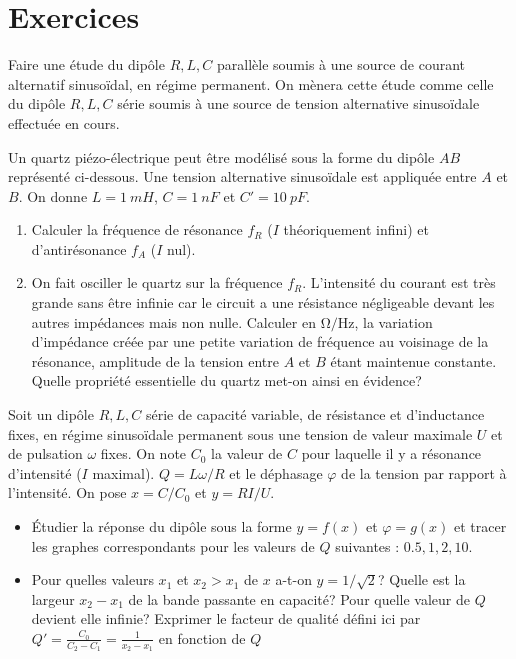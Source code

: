 \section{Exercices}%
\begin{exercice}%
  Faire une étude du dipôle \(R, L, C\) parallèle soumis à une source de 
  courant alternatif sinusoïdal, en régime permanent. On mènera cette étude 
  comme celle du dipôle \(R, L, C\) série soumis à une source de tension 
  alternative sinusoïdale effectuée en cours.
\end{exercice}%
\begin{exercice}%
  Un quartz piézo-électrique peut être modélisé sous la forme du dipôle \(AB\) 
  représenté ci-dessous. Une tension alternative sinusoïdale est appliquée 
  entre \(A\) et \(B\). On donne \(L=\SI{1}{mH}\), \(C=\SI{1}{nF}\) et 
  \(C'=\SI{10}{pF}\).
  \begin{enumerate}
    \item Calculer la fréquence de résonance \(f_R\) (\(I\) théoriquement 
    infini) et d'antirésonance \(f_A\) (\(I\) nul). \item On fait osciller le 
      quartz sur la fréquence \(f_R\). L'intensité du courant est très grande 
      sans être infinie car le circuit a une résistance négligeable devant les 
      autres impédances mais non nulle. Calculer en \(\si{\ohm\per\hertz}\), la 
      variation d'impédance créée par une petite variation de fréquence au 
      voisinage de la résonance, amplitude de la tension entre \(A\) et \(B\) 
      étant maintenue constante. Quelle propriété essentielle du quartz met-on 
      ainsi en évidence?
  \end{enumerate}
\end{exercice}%
\begin{exercice}%
  Soit un dipôle \(R, L, C\) série de capacité variable, de résistance et 
  d'inductance fixes, en régime sinusoïdale permanent sous une tension de 
  valeur maximale \(U\) et de pulsation \(\omega\) fixes. On note \(C_0\) la 
  valeur de \(C\) pour laquelle il y a résonance d'intensité (\(I\) maximal). 
  \(Q = L\omega/R\) et le déphasage \(\varphi\) de la tension par rapport à 
  l'intensité. On pose \(x = C/C_0\) et \(y=RI/U\).
  \begin{itemize}
    \item Étudier la réponse du dipôle sous la forme \(y=f(x)\) et 
      \(\varphi=g(x)\) et tracer les graphes correspondants pour les valeurs de 
      \(Q\) suivantes : \(0.5, 1, 2, 10\).
    \item Pour quelles valeurs \(x_1\) et \(x_2>x_1\) de \(x\) a-t-on 
      \(y=1/\sqrt{2}\)? Quelle est la largeur \(x_2-x_1\) de la bande passante 
      en capacité? Pour quelle valeur de \(Q\) devient elle infinie? Exprimer 
      le facteur de qualité défini ici par \(Q' = \frac{C_0}{C_2-C_1} = 
      \frac{1}{x_2-x_1}\) en fonction de \(Q\)
  \end{itemize}
\end{exercice}%
